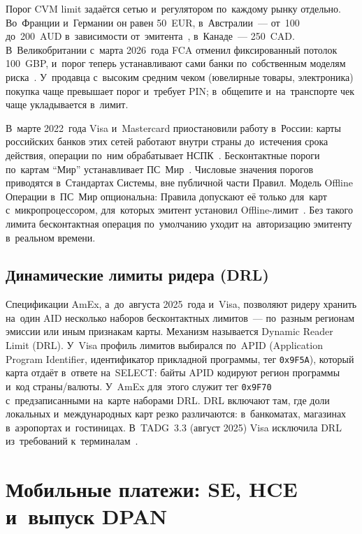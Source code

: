 Порог CVM limit задаётся сетью и~регулятором по~каждому рынку отдельно.
Во~Франции и~Германии он равен 50~EUR, в~Австралии~--- от~100 до~200~AUD
в~зависимости от~эмитента~\cite{westpac-contactless-faq,zeller-contactless-limits},
в~Канаде~--- 250~CAD. В~Великобритании с~марта 2026~года FCA отменил фиксированный потолок
100~GBP, и~порог теперь устанавливают сами банки по~собственным моделям
риска~\cite{visa-core-rules,mc-rules,fca-cvm-limit-2026}. У~продавца с~высоким
средним чеком (ювелирные товары, электроника) покупка чаще превышает порог
и~требует PIN; в~общепите и~на~транспорте чек чаще укладывается в~лимит.

В~марте 2022~года Visa и~Mastercard приостановили работу в~России: карты
российских банков этих сетей работают внутри страны до~истечения срока действия,
операции по~ним обрабатывает НСПК~\cite{izvestia-cbr-visa-mc-2022}.
Бесконтактные пороги по~картам \enquote{Мир} устанавливает
ПС~Мир~\cite{nspk-mir-rules}. Числовые значения порогов приводятся в~Стандартах
Системы, вне публичной части Правил. Модель Offline Операции в~ПС~Мир
опциональна: Правила допускают её только для~карт с~микропроцессором, для~которых
эмитент установил Offline-лимит~\cite{nspk-mir-rules}. Без такого лимита
бесконтактная операция по~умолчанию уходит на~авторизацию эмитенту в~реальном
времени.

\subsection*{Динамические лимиты ридера (DRL)}\label{sec:contactless-drl}

Спецификации AmEx, а~до~августа 2025~года и~Visa, позволяют ридеру хранить на~один AID несколько наборов
бесконтактных лимитов~--- по~разным регионам эмиссии или иным признакам карты.
Механизм называется Dynamic Reader Limit (DRL). У~Visa профиль лимитов
выбирался по~APID (Application Program Identifier, идентификатор прикладной
программы, тег \texttt{0x9F5A}), который карта отдаёт в~ответе на~SELECT: байты
APID кодируют регион программы и~код страны/валюты. У~AmEx для~этого служит
тег \texttt{0x9F70} с~предзаписанными на~карте наборами DRL. DRL включают там, где
доли локальных и~международных карт резко различаются: в~банкоматах, магазинах
в~аэропортах и~гостиницах. В~TADG~3.3 (август 2025) Visa исключила DRL
из~требований к~терминалам~\cite{visa-tadg}.

\section{Мобильные платежи: SE, HCE и~выпуск DPAN}\label{sec:contactless-mobile}

